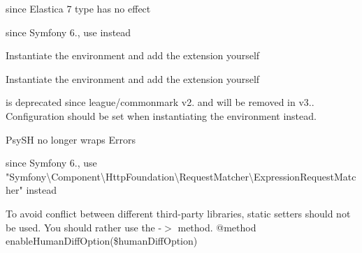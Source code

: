 \begin{DoxyRefList}
%
since Elastica 7 type has no effect  
\item[Global \doxylink{class_symfony_1_1_component_1_1_mime_1_1_email_a6eeb381d7d22c29b1e14cb78370b62b9}{Email\+::attach\+Part} (Data\+Part \$part)]\label{deprecated__deprecated000348}%
%
since Symfony 6., use  instead  
\item[Global \doxylink{class_league_1_1_common_mark_1_1_environment_1_1_environment_aa35b8709fb0133cc336cfb77e573637f}{Environment\+::create\+Common\+Mark\+Environment} (array \$config=\mbox{[}\mbox{]})]\label{deprecated__deprecated000077}%
%
Instantiate the environment and add the extension yourself 
\item[Global \doxylink{class_league_1_1_common_mark_1_1_environment_1_1_environment_a84d2c79427667e2c583da9d42fd189bf}{Environment\+::create\+GFMEnvironment} (array \$config=\mbox{[}\mbox{]})]\label{deprecated__deprecated000078}%
%
Instantiate the environment and add the extension yourself 
\item[Global \doxylink{class_league_1_1_common_mark_1_1_environment_1_1_environment_aa52db437dc14c854eb4a34ee9349f20c}{Environment\+::merge\+Config} (array \$config)]\label{deprecated__deprecated000076}%
%
 is deprecated since league/commonmark v2. and will be removed in v3.. Configuration should be set when instantiating the environment instead. 
\item[Global \doxylink{class_psy_1_1_exception_1_1_error_exception_a29abc0440d44922f1e6ea1fb80376266}{Error\+Exception\+::from\+Error} (\textbackslash{}Error \$e)]\label{deprecated__deprecated000265}%
%
Psy\+SH no longer wraps Errors 
\item[Class \doxylink{class_symfony_1_1_component_1_1_http_foundation_1_1_expression_request_matcher}{Expression\+Request\+Matcher} ]\label{deprecated__deprecated000330}%
%
since Symfony 6., use "{}\+Symfony\textbackslash{}\+Component\textbackslash{}\+Http\+Foundation\textbackslash{}\+Request\+Matcher\textbackslash{}\+Expression\+Request\+Matcher"{} instead  
\item[Class \doxylink{class_carbon_1_1_factory}{Factory} ]\label{deprecated__deprecated000122}%
%
To avoid conflict between different third-\/party libraries, static setters should not be used. You should rather use the -\/\texorpdfstring{$>$}{>} method. @method  enable\+Human\+Diff\+Option(\$human\+Diff\+Option) 




\end{DoxyRefList}
